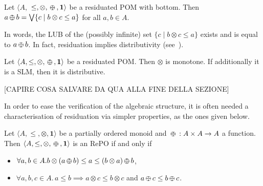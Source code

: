 \documentclass{llncs}
\def\1{{\mathbf 1}}
\newcommand{\shortNoProof}[1]{ }
\def\monid{{\mathbf 0}}
\def\1{{\mathbf 1}}
\def\monop{\otimes}
\def\odiv{\, {\ominus\hspace{-7.7pt} \div} \,}
\def\monid{\mathbf{1}}
\begin{document}
\begin{lemma}\label{rclm1}
	Let $\langle A,$ $\leq, \otimes,  \odiv, \1 \rangle$ be a residuated POM with bottom.
	Then $a \odiv b = \bigvee \{c \mid b \otimes c \leq a\}$ for all $a, b \in A$.
\end{lemma}

In words, the LUB of the (possibly infinite) set 
$\{c \mid b \otimes c \leq a\}$ exists and is equal to $a \odiv b$.
%
In fact, residuation implies distributivity (see~\cite[Lemma 2.2]{ipl17}).

\begin{lemma}\label{rclm2}
	Let $\langle A, \leq, \monop, \odiv, \1 \rangle$ be a residuated POM. 
	Then $\monop$ is monotone.
	If additionally it is a SLM, then it is distributive.
\end{lemma}

\shortNoProof{
\begin{proof}
	By definition $a \odiv b$ is an upper bound of 
	$\{ c \mid b \monop c \leq a\}$ and $b \monop (a \odiv b) \leq a$.
\qed
\end{proof}
}


[CAPIRE COSA SALVARE DA QUA ALLA FINE DELLA SEZIONE]

In order to ease the verification of the algebraic structure, it is often needed
a characterisation of residuation via simpler properties,
as the ones given below.

\begin{lemma}
\label{mono}
Let $\langle A, \leq, \monop, \monid \rangle$ be a partially ordered monoid  and
	$\odiv: A \times A \rightarrow A$ a function. Then $\langle A, \leq, \monop, \odiv, \monid \rangle$ is an RePO if and only if
	\begin{itemize}
		\item $\forall a, b \in A. b \monop (a \odiv b) \leq a \leq (b \monop a) \odiv b$,
		\item $\forall a, b, c \in A.\, a \leq b \implies a \otimes c \leq b \otimes c$ and $a\odiv c \leq b \odiv c$.
\end{itemize}
\end{lemma}
\end{document}
